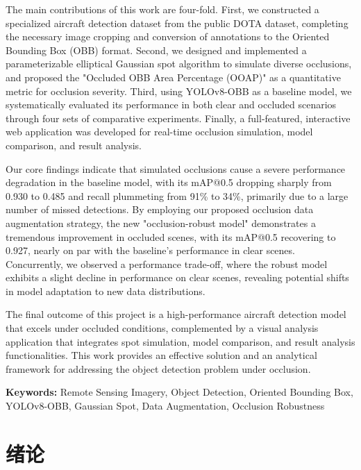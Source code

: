 \documentclass[12pt, a4paper]{report}
\begin{document}
\noindent The main contributions of this work are four-fold. First, we constructed a specialized aircraft detection dataset from the public DOTA dataset, completing the necessary image cropping and conversion of annotations to the Oriented Bounding Box (OBB) format. Second, we designed and implemented a parameterizable elliptical Gaussian spot algorithm to simulate diverse occlusions, and proposed the "Occluded OBB Area Percentage (OOAP)" as a quantitative metric for occlusion severity. Third, using YOLOv8-OBB as a baseline model, we systematically evaluated its performance in both clear and occluded scenarios through four sets of comparative experiments. Finally, a full-featured, interactive web application was developed for real-time occlusion simulation, model comparison, and result analysis.

\noindent Our core findings indicate that simulated occlusions cause a severe performance degradation in the baseline model, with its mAP@0.5 dropping sharply from 0.930 to 0.485 and recall plummeting from 91\% to 34\%, primarily due to a large number of missed detections. By employing our proposed occlusion data augmentation strategy, the new "occlusion-robust model" demonstrates a tremendous improvement in occluded scenes, with its mAP@0.5 recovering to 0.927, nearly on par with the baseline's performance in clear scenes. Concurrently, we observed a performance trade-off, where the robust model exhibits a slight decline in performance on clear scenes, revealing potential shifts in model adaptation to new data distributions.

\noindent The final outcome of this project is a high-performance aircraft detection model that excels under occluded conditions, complemented by a visual analysis application that integrates spot simulation, model comparison, and result analysis functionalities. This work provides an effective solution and an analytical framework for addressing the object detection problem under occlusion.

\vspace{-0.5em}
\noindent\textbf{Keywords:} Remote Sensing Imagery, Object Detection, Oriented Bounding Box, YOLOv8-OBB, Gaussian Spot, Data Augmentation, Occlusion Robustness

\newpage
\tableofcontents
\newpage


\chapter{绪论}
\end{document}
